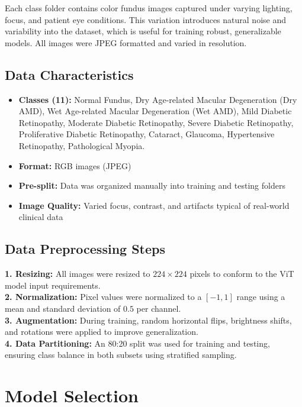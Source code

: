 \documentclass[a4paper,12pt]{report}
\begin{document}
Each class folder contains color fundus images captured under varying lighting, focus, and patient eye conditions. This variation introduces natural noise and variability into the dataset, which is useful for training robust, generalizable models. All images were JPEG formatted and varied in resolution.

\subsection{Data Characteristics}
\begin{itemize}
  \item \textbf{Classes (11):} Normal Fundus, Dry Age-related Macular Degeneration (Dry AMD), Wet Age-related Macular Degeneration (Wet AMD), Mild Diabetic Retinopathy, Moderate Diabetic Retinopathy, Severe Diabetic Retinopathy, Proliferative Diabetic Retinopathy, Cataract, Glaucoma, Hypertensive Retinopathy, Pathological Myopia.

    \item \textbf{Format:} RGB images (JPEG)
    \item \textbf{Pre-split:} Data was organized manually into training and testing folders
    \item \textbf{Image Quality:} Varied focus, contrast, and artifacts typical of real-world clinical data
\end{itemize}

\subsection{Data Preprocessing Steps}

\textbf{1. Resizing:} All images were resized to $224 \times 224$ pixels to conform to the ViT model input requirements. \\
\textbf{2. Normalization:} Pixel values were normalized to a $[-1, 1]$ range using a mean and standard deviation of $0.5$ per channel. \\
\textbf{3. Augmentation:} During training, random horizontal flips, brightness shifts, and rotations were applied to improve generalization. \\
\textbf{4. Data Partitioning:} An 80:20 split was used for training and testing, ensuring class balance in both subsets using stratified sampling.

\vspace{0.5cm}

\section{Model Selection}
\end{document}
